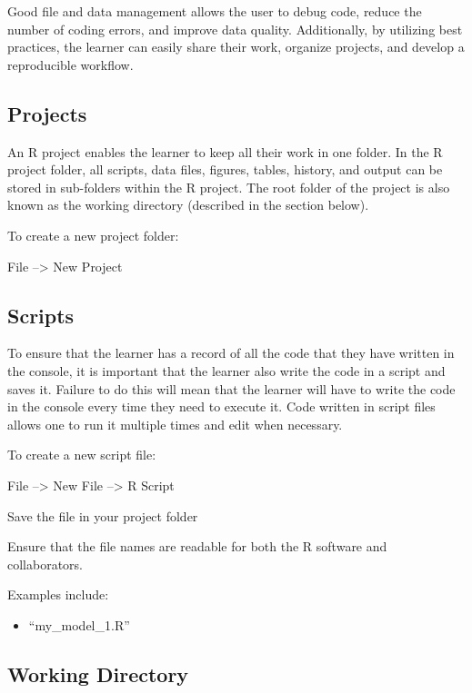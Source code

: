 \documentclass[
  letterpaper,
  DIV=11,
  numbers=noendperiod]{scrreprt}
\providecommand{\tightlist}{%
  \setlength{\itemsep}{0pt}\setlength{\parskip}{0pt}}\usepackage{longtable,booktabs,array}
\begin{document}
Good file and data management allows the user to debug code, reduce the
number of coding errors, and improve data quality. Additionally, by
utilizing best practices, the learner can easily share their work,
organize projects, and develop a reproducible workflow.

\subsection{Projects}\label{projects}

An R project enables the learner to keep all their work in one folder.
In the R project folder, all scripts, data files, figures, tables,
history, and output can be stored in sub-folders within the R project.
The root folder of the project is also known as the working directory
(described in the section below).

To create a new project folder:

File --\textgreater{} New Project

\subsection{Scripts}\label{scripts}

To ensure that the learner has a record of all the code that they have
written in the console, it is important that the learner also write the
code in a script and saves it. Failure to do this will mean that the
learner will have to write the code in the console every time they need
to execute it. Code written in script files allows one to run it
multiple times and edit when necessary.

To create a new script file:

File --\textgreater{} New File --\textgreater{} R Script

Save the file in your project folder

Ensure that the file names are readable for both the R software and
collaborators.

Examples include:

\begin{itemize}
\tightlist
\item
  ``my\_model\_1.R''
\end{itemize}

\subsection{Working Directory}\label{working-directory}
\end{document}
